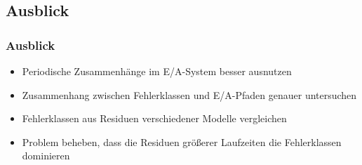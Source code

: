 \documentclass{beamer}
\newcommand{\backupend}{
	\setcounter{framenumber}{\value{finalframe}}
}
\begin{document}
\subsection*{Ausblick}
\begin{frame}
	\frametitle{Ausblick}
	\begin{itemize}
		\item Periodische Zusammenhänge im E/A-System besser ausnutzen
		\item Zusammenhang zwischen Fehlerklassen und E/A-Pfaden genauer untersuchen
		\item Fehlerklassen aus Residuen verschiedener Modelle vergleichen
		\item Problem beheben, dass die Residuen größerer Laufzeiten die Fehlerklassen dominieren
	\end{itemize}	
\end{frame}
\backupend
\end{document}
